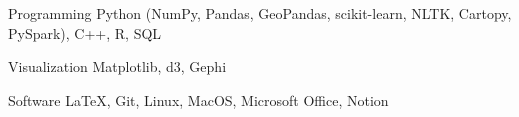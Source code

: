 

\begin{cvskills}

  \cvskill
    {Programming} %
    {Python (NumPy, Pandas, GeoPandas, scikit-learn, 
    NLTK, 
    Cartopy, PySpark), C++, R, 
    SQL} %

  \cvskill
    {Visualization} %
    {Matplotlib, d3, Gephi
    }
    
  \cvskill
    {Software} %
    {\LaTeX, Git, Linux, MacOS, Microsoft Office, Notion}





\end{cvskills}